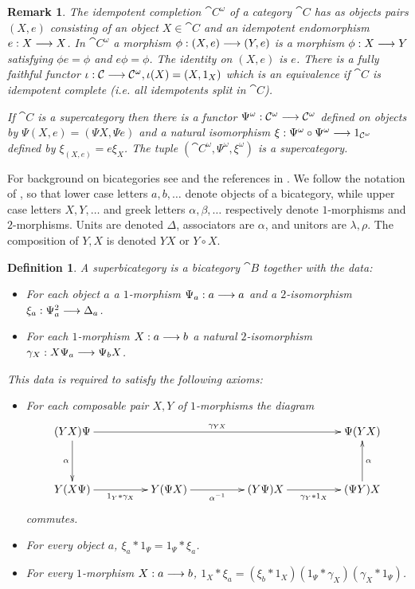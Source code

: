 \documentclass[english,letter paper,12pt,leqno]{article}
\theoremstyle{example}
\newtheorem{definition}[theorem]{Definition}
\newtheorem{remark}[theorem]{Remark}
\numberwithin{equation}{section}
\begin{document}
\begin{remark}\label{remark:idempotent_completion} The \emph{idempotent completion} $\cat{C}^\omega$ of a category $\cat{C}$ has as objects pairs $(X,e)$ consisting of an object $X \in \cat{C}$ and an idempotent endomorphism $e: X \longrightarrow X$. In $\cat{C}^\omega$ a morphism $\phi: (X,e) \longrightarrow (Y,e)$ is a morphism $\phi: X \longrightarrow Y$ satisfying $\phi e = \phi$ and $e \phi = \phi$. The identity on $(X,e)$ is $e$. There is a fully faithful functor $\iota: \mathcal{C} \longrightarrow \mathcal{C}^{\omega}, \iota(X) = (X,1_X)$ which is an equivalence if $\cat{C}$ is idempotent complete (i.e. all idempotents split in $\cat{C}$).

If $\cat{C}$ is a supercategory then there is a functor $\Psi^\omega: \mathcal{C}^\omega \longrightarrow \mathcal{C}^\omega$ defined on objects by $\Psi(X,e) = (\Psi X, \Psi e)$ and a natural isomorphism $\xi: \Psi^\omega \circ \Psi^\omega \longrightarrow 1_{\mathcal{C}^\omega}$ defined by $\xi_{(X,e)} = e \xi_X$. The tuple $(\cat{C}^\omega, \Psi^\omega, \xi^\omega)$ is a supercategory.
\end{remark}

For background on bicategories see \cite{bor94} and the references in \cite{lgdual}. We follow the notation of \cite{lgdual}, so that lower case letters $a,b, \ldots$ denote objects of a bicategory, while upper case letters $X,Y, \ldots$ and greek letters $\alpha, \beta, \ldots$ respectively denote $1$-morphisms and $2$-morphisms. Units are denoted $\Delta$, associators are $\alpha$, and unitors are $\lambda, \rho$. The composition of $Y,X$ is denoted $YX$ or $Y \circ X$.

\begin{definition} A \emph{superbicategory} is a bicategory $\cat{B}$ together with the data:
\begin{itemize}
\item For each object $a$ a $1$-morphism $\Psi_a: a \longrightarrow a$ and a $2$-isomorphism $\xi_a: \Psi^2_a \longrightarrow \Delta_a$.
\item For each $1$-morphism $X: a \longrightarrow b$ a natural $2$-isomorphism $\gamma_X: X \Psi_a \longrightarrow \Psi_b X$.
\end{itemize}
This data is required to satisfy the following axioms:
\begin{itemize}
\item For each composable pair $X,Y$ of $1$-morphisms the diagram
\[
\xymatrix@C+2pc@R+1pc{
(YX) \Psi \ar[rrr]^-{\gamma_{YX}} \ar[d]_-{\alpha} & & & \Psi ( YX )\\
Y ( X \Psi ) \ar[r]_-{1_Y * \gamma_X} & Y( \Psi X ) \ar[r]_-{\alpha^{-1}} & ( Y \Psi ) X \ar[r]_-{\gamma_Y * 1_X} & (\Psi Y ) X \ar[u]_-{\alpha}
}
\]
commutes.
\item For every object $a$, $\xi_a * 1_\Psi = 1_\Psi * \xi_a$.
\item For every $1$-morphism $X : a \longrightarrow b$, $1_X * \xi_a = ( \xi_b * 1_X ) ( 1_\Psi * \gamma_X ) (\gamma_X * 1_\Psi )$.
\end{itemize}
\end{definition}
\end{document}

